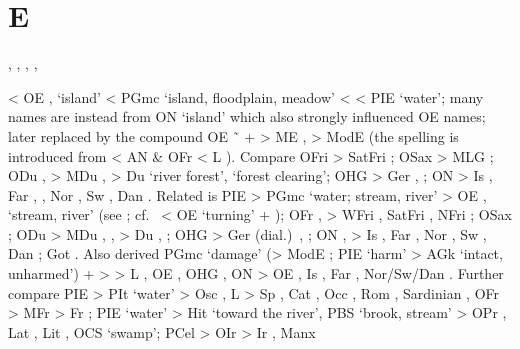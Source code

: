 \documentclass[12pt,letterpaper,oneside,article,draft]{memoir}
\begin{document}
\section*{E}

\begin{Lemma}
\begin{Also}
	, , , , 
\end{Also}
\begin{Etymology}
	< OE ,  ‘island’ < PGmc  ‘island, floodplain, meadow’ < 
		< PIE  ‘water’;
		many names are instead from ON  ‘island’ which also strongly influenced OE names;
		later replaced by the compound OE  \~\  +  >
			ME ,  > ModE 
			(the  spelling is introduced from  < AN \& OFr  < L ).
	Compare
	OFri  > SatFri ;
	OSax  > MLG ;
	ODu ,  > MDu ,  > Du  ‘river forest’,
		 ‘forest clearing’;
	OHG  > Ger , ;
	ON  > Is , Far , , Nor , Sw , Dan .
	Related is
	PIE  > PGmc  ‘water; stream, river’ > OE ,  ‘stream, river’
		(see ; cf.\  < OE  ‘turning’ + );
		OFr ,  > WFri , SatFri , NFri ;
		OSax ;
		ODu  > MDu , ,  > Du , ;
		OHG  > Ger (dial.)\ , ;
		ON ,  > Is , Far , Nor \fm{å}, Sw , Dan ;
		Got  .
	Also derived PGmc  ‘damage’
		(> ModE ; PIE  ‘harm’ >
			AGk   ‘intact, unharmed’)
		+  >  > L ,
		OE , OHG , ON  > OE , Is ,
			Far , Nor/Sw/Dan .
	Further compare  PIE  > PIt  ‘water’ > Osc  ,
		L  > Sp ,
			Cat , Occ , Rom , Sardinian ,
			OFr  > MFr  > Fr ;
		PIE  ‘water’ > Hit   ‘toward the river’,
			PBS  ‘brook, stream’ > OPr , Lat , Lit ,
				OCS   ‘swamp’;
			PCel  > OIr  > Ir , Manx 

\end{Etymology}
\end{Lemma}
\end{document}
